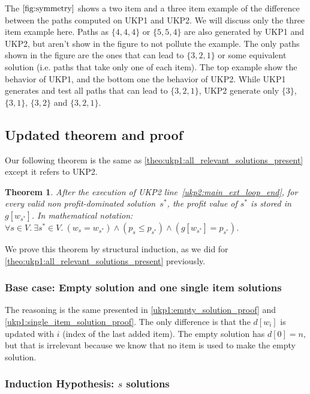 \documentclass[12pt]{article}
\newtheorem{theorem}{Theorem}
\begin{document}
The \(\autoref{fig:symmetry}\) shows a two item and a three item example of the difference between the paths computed on UKP1 and UKP2. We will discuss only the three item example here. Paths as \(\{4,4,4\}\) or \(\{5,5,4\}\) are also generated by UKP1 and UKP2, but aren't show in the figure to not pollute the example. The only paths shown in the figure are the ones that can lead to \(\{3,2,1\}\) or some equivalent solution (i.e. paths that take only one of each item). The top example show the behavior of UKP1, and the bottom one the behavior of UKP2. While UKP1 generates and test all paths that can lead to \(\{3,2,1\}\), UKP2 generate only \(\{3\}\), \(\{3,1\}\), \(\{3,2\}\) and \(\{3,2,1\}\).

\subsection{Updated theorem and proof}

Our following theorem is the same as \ref{theo:ukp1:all_relevant_solutions_present} except it refers to UKP2.
\vspace{0.3cm}
\begin{theorem}\label{theo:ukp2:all_relevant_solutions_present}
After the execution of UKP2 line~\ref{ukp2:main_ext_loop_end}, for every valid non profit-dominated solution~\(s^*\), the profit value of \(s^*\) is stored in \(g[w_{s^*}]\). In mathematical notation: \(\forall s \in V.~\exists s^* \in V.~(w_s = w_{s^*}) \land (p_s \leq p_{s^*}) \land (g[w_{s^*}] = p_{s^*})\).
\end{theorem}

\noindent
We prove this theorem by structural induction, as we did for \autoref{theo:ukp1:all_relevant_solutions_present} previously.

\subsubsection{Base case: Empty solution and one single item solutions}

The reasoning is the same presented in \autoref{ukp1:empty_solution_proof} and \autoref{ukp1:single_item_solution_proof}. The only difference is that the \(d[w_i]\) is updated with \(i\) (index of the last added item). The empty solution has \(d[0] = n\), but that is irrelevant because we know that no item is used to make the empty solution.

\subsubsection{Induction Hypothesis: \(s\) solutions}
\end{document}
